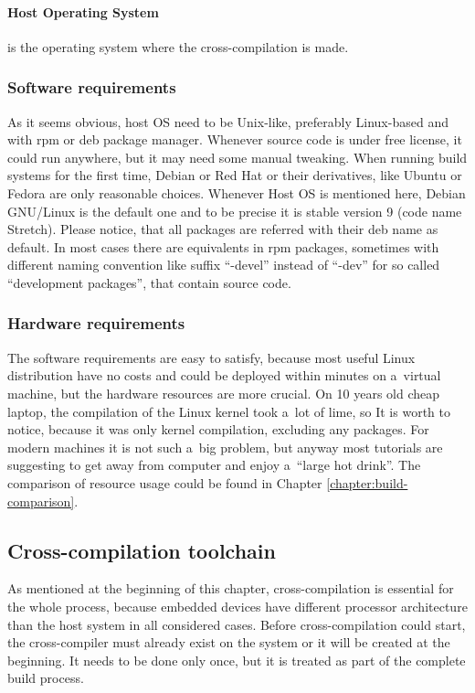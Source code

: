 \documentclass[printmode]{mgr}
\begin{document}
\paragraph{Host Operating System} is the operating system where the cross-compilation is made.

\subsubsection{Software requirements}
As it seems obvious, host OS need to be Unix-like, preferably Linux-based and with rpm or deb package manager.
Whenever source code is under free license, it could run anywhere, but it may need some manual tweaking.
When running build systems for the first time, Debian or Red Hat or their derivatives, like Ubuntu or Fedora are only reasonable choices.
Whenever Host OS is mentioned here, Debian GNU/Linux is the default one and to be precise it is stable version 9 (code name Stretch).
Please notice, that all packages are referred with their deb name as default.
In most cases there are equivalents in rpm packages, sometimes with different naming convention like suffix ``-devel'' instead of ``-dev'' for so called ``development packages'', that contain source code.

\subsubsection{Hardware requirements}
The software requirements are easy to satisfy, because most useful Linux distribution have no costs and could be deployed within minutes on a~virtual machine, but the hardware resources are more crucial.
On 10 years old cheap laptop, the compilation of the Linux kernel took a~lot of lime, so It is worth to notice, because it was only kernel compilation, excluding any packages.
For modern machines it is not such a~big problem, but anyway most tutorials are suggesting to get away from computer and enjoy a~``large hot drink''.
The comparison of resource usage could be found in Chapter \ref{chapter:build-comparison}.

\subsection{Cross-compilation toolchain}

As mentioned at the beginning of this chapter, cross-compilation is essential for the whole process, because embedded devices have different processor architecture than the host system in all considered cases.
Before cross-compilation could start, the cross-compiler must already exist on the system or it will be created at the beginning.
It needs to be done only once, but it is treated as part of the complete build process.
\end{document}
